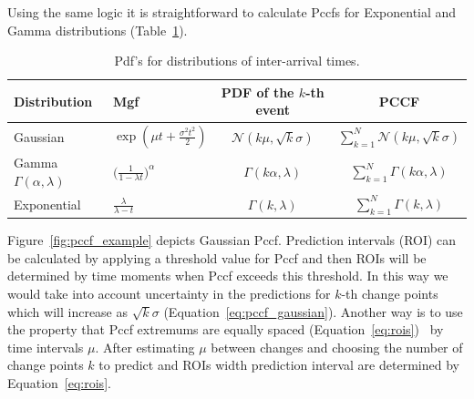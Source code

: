 Using the same logic it is straightforward to calculate Pccfs for Exponential and Gamma distributions (Table~\ref{table:pccfs}).
\begin{table}[!htb] \caption{Pdf's for distributions of inter-arrival times.}\label{table:pccfs}
	\begin{center}
		\begin{tabular}{|l|l|c|c|}
			\hline
			Distribution & Mgf & PDF of the $k$-th event & PCCF  \\[5pt]
			\hline
			Gaussian & $\exp{ (\mu t + \frac{\sigma^2 t^2}{2}) }$ & $\mathcal{N}(k \mu, \sqrt{k} \sigma)$ & $\sum_{k=1}^N \mathcal{N}(k \mu, \sqrt{k} \sigma)$ \\
			Gamma $\Gamma(\alpha, \lambda)$ & $\Big ( \frac{1}{1- \lambda t} \Big )^{\alpha}$ & $\Gamma(k \alpha, \lambda)$ & $\sum_{k=1}^N \Gamma(k \alpha, \lambda)$\\
			Exponential & $\frac{\lambda}{\lambda - t}$ & $\Gamma(k, \lambda)$ & $\sum_{k=1}^N \Gamma(k, \lambda)$\\
			\hline
		\end{tabular}
	\end{center}
\end{table}
Figure~\ref{fig:pccf_example} depicts Gaussian Pccf.
Prediction intervals (ROI) can be calculated by applying a threshold value for Pccf and then ROIs will be determined by time moments when Pccf exceeds this threshold.
In this way we would take into account uncertainty in the predictions for $k$-th change points which will increase as $\sqrt{k} \sigma$ (Equation~\ref{eq:pccf_gaussian}).
Another way is to use the property that Pccf extremums are equally spaced (Equation~\ref{eq:rois})~\cite{MaslovSDM2016} by time intervals $\mu$.
After estimating $\mu$ between changes and choosing the number of change points $k$ to predict and ROIs width prediction interval are determined by Equation~\ref{eq:rois}.
